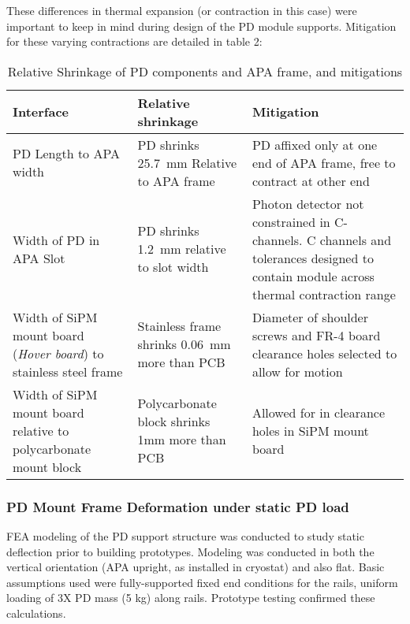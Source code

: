 These differences in thermal expansion (or contraction in this case) were 
important to keep in mind during design of the PD module supports.  
Mitigation for these varying contractions are detailed in table 2:


\begin{table}[h!]
\label{tbl:fdsfpdshrinkeffects}
\begin{center}
\caption{Relative Shrinkage of PD components and APA frame, and mitigations}
\begin{tabular}{|p{}|p{}|p{}}
\hline
\textbf{Interface} & \textbf{Relative shrinkage} & \textbf{Mitigation} \\
\hline
PD Length to APA width & PD shrinks 25.7~mm Relative to APA frame & PD affixed only at one end of APA frame, free to contract at other end \\
\hline
Width of PD in APA Slot & PD shrinks 1.2~mm relative to slot width & Photon detector not constrained in C-channels. C channels and tolerances designed to contain module across thermal contraction range \\
\hline
Width of SiPM mount board ({\it Hover board}) to stainless steel frame & Stainless frame shrinks 0.06~mm more than PCB & Diameter of shoulder screws and FR-4 board clearance holes selected to allow for motion \\
\hline
Width of SiPM mount board relative to polycarbonate mount block & Polycarbonate block shrinks 1mm more than PCB & Allowed for in clearance holes in SiPM mount board \\
\hline
\end{tabular}
\end{center}
\end{table}


\subsubsection{PD Mount Frame Deformation under static PD load}

FEA modeling of the PD support structure was conducted to study static deflection 
prior to building prototypes.  Modeling was conducted in both the vertical
 orientation (APA upright, as installed in cryostat) and also flat.  
Basic assumptions used were fully-supported fixed end conditions for the rails, 
uniform loading of 3X PD mass (5 kg) along rails.  
Prototype testing confirmed these calculations.

